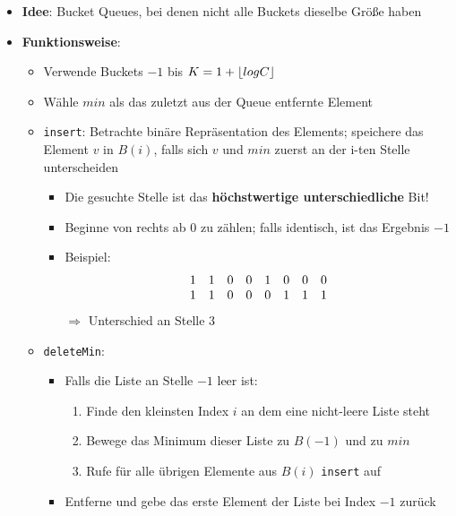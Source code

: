 	\begin{itemize}
		\item \textbf{Idee}: Bucket Queues, bei denen nicht alle Buckets dieselbe Größe haben
		\item \textbf{Funktionsweise}:
		\begin{itemize}
			\item Verwende Buckets $-1$ bis $K = 1 + \lfloor log C\rfloor$
			\item Wähle $min$ als das zuletzt aus der Queue entfernte Element
			\item \texttt{insert}: Betrachte binäre Repräsentation des Elements; speichere das Element $v$ in $B(i)$, falls sich $v$ und $min$ zuerst an der i-ten Stelle unterscheiden
			\begin{itemize}
				\item Die gesuchte Stelle ist das \textbf{höchstwertige unterschiedliche} Bit!
				\item Beginne von rechts ab $0$ zu zählen; falls identisch, ist das Ergebnis $-1$
				\item Beispiel: $$\begin{array}{c c c c c c c c}
					1&1&0&0&1&0&0&0\\
					1&1&0&0&0&1&1&1
				\end{array}$$ $\Rightarrow$ Unterschied an Stelle $3$
			\end{itemize}
			\item \texttt{deleteMin}:
			\begin{itemize}
				\item Falls die Liste an Stelle $-1$ leer ist:
				\begin{enumerate}
					\item Finde den kleinsten Index $i$ an dem eine nicht-leere Liste steht
					\item Bewege das Minimum dieser Liste zu $B(-1)$ und zu $min$
					\item Rufe für alle übrigen Elemente aus $B(i)$ \texttt{insert} auf
				\end{enumerate}
				\item Entferne und gebe das erste Element der Liste bei Index $-1$ zurück
			\end{itemize}
		\end{itemize}
	\end{itemize}